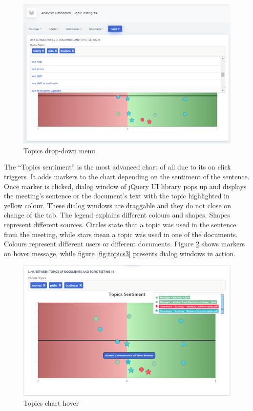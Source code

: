 \documentclass{article}
\begin{document}
\begin{figure}[H]
  \centering
  \includegraphics[scale=0.75]{charts/topics1.png}
  \caption{Topics drop-down menu}
  \label{fig:topics1}
\end{figure}

{\large 
 The ``Topics sentiment'' is the most advanced chart of all due to its on click triggers. It adds markers to the chart depending on the sentiment of the sentence. Once marker is clicked, dialog window of jQuery UI library pops up and displays the meeting's sentence or the document's text with the topic highlighted in yellow colour. These dialog windows are draggable and they do not close on change of the tab. The legend explains different colours and shapes. Shapes represent different sources. Circles state that a topic was used in the sentence from the meeting, while stars mean a topic was used in one of the documents. Colours represent different users or different documents. Figure \ref{fig:topics2} shows markers on hover message, while figure \ref{fig:topics3} presents dialog windows in action.\par
}

\begin{figure}[H]
  \centering
  \includegraphics[scale=0.74]{charts/topics2.png}
  \caption{Topics chart hover}
  \label{fig:topics2}
\end{figure}
\end{document}
